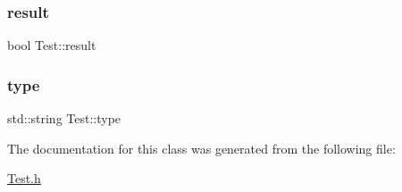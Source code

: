 \hypertarget{class_test_a00ac92c896939892dd9e28a5b4b3e5b7}{}\label{class_test_a00ac92c896939892dd9e28a5b4b3e5b7} 
\subsubsection{\texorpdfstring{result}{result}}
{\footnotesize\ttfamily bool Test\+::result\hspace{0.3cm}{\ttfamily [private]}}

\hypertarget{class_test_a62aead72f049c0462c5b45d5a48b296f}{}\label{class_test_a62aead72f049c0462c5b45d5a48b296f} 
\subsubsection{\texorpdfstring{type}{type}}
{\footnotesize\ttfamily std\+::string Test\+::type\hspace{0.3cm}{\ttfamily [private]}}



The documentation for this class was generated from the following file\+:\begin{DoxyCompactItemize}
\item 
\hyperlink{_test_8h}{Test.\+h}\end{DoxyCompactItemize}
